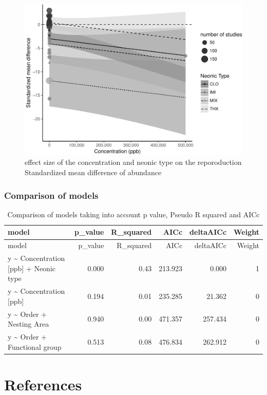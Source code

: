 \documentclass[]{elsarticle} %
\makeatletter
\def\maxwidth{\ifdim\Gin@nat@width>\linewidth\linewidth
\else\Gin@nat@width\fi}
\let\Oldincludegraphics\includegraphics
\renewcommand{\includegraphics}[1]{\Oldincludegraphics[width=\maxwidth]{#1}}
\makeatother
\begin{document}
\begin{figure}[htbp]
\centering
\includegraphics{MetanalysisNeonics_files/figure-latex/unnamed-chunk-29-1.pdf}
\caption{effect size of the concentration and neonic type on the
reporoduction Standardized mean difference of abundance}
\end{figure}

\subsubsection{Comparison of models}\label{comparison-of-models-2}

\begin{longtable}[c]{@{}lrrrrr@{}}
\caption{Comparison of models taking into account p value, Pseudo R
squared and AICc}\tabularnewline
\toprule
model & p\_value & R\_squared & AICc & deltaAICc & Weight\tabularnewline
\midrule
\endfirsthead
\toprule
model & p\_value & R\_squared & AICc & deltaAICc & Weight\tabularnewline
\midrule
\endhead
y \textasciitilde{} Concentration {[}ppb{]} + Neonic type & 0.000 & 0.43
& 213.923 & 0.000 & 1\tabularnewline
y \textasciitilde{} Concentration {[}ppb{]} & 0.194 & 0.01 & 235.285 &
21.362 & 0\tabularnewline
y \textasciitilde{} Order + Nesting Area & 0.940 & 0.00 & 471.357 &
257.434 & 0\tabularnewline
y \textasciitilde{} Order + Functional group & 0.513 & 0.08 & 476.834 &
262.912 & 0\tabularnewline
\bottomrule
\end{longtable}

\section*{References}\label{references}
\end{document}
